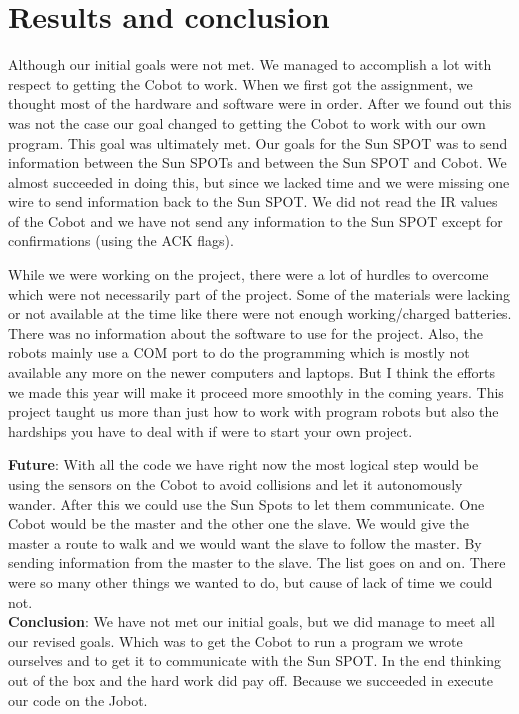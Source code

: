 \documentclass[a4paper,10pt]{article} %
\begin{document}

\section{Results and conclusion} %

Although our initial goals were not met. We managed to accomplish a lot with
respect to getting the Cobot to work. When we first got the assignment, we
thought most of the hardware and software were in order. After we found out this
was not the case our goal changed to getting the Cobot to work with our own
program. This goal was ultimately met. Our goals for the Sun SPOT was to send
information between the Sun SPOTs and between the Sun SPOT and Cobot. We almost
succeeded in doing this, but since we lacked time and we were missing one wire
to send information back to the Sun SPOT. We did not read the IR values of the
Cobot and we have not send any information to the Sun SPOT except for
confirmations (using the ACK flags).

While we were working on the project, there were a lot of hurdles to overcome
which were not necessarily part of the project. Some of the materials were
lacking or not available at the time like there were not enough working/charged
batteries. There was no information about the software to use for the project.
Also, the robots mainly use a COM port to do the programming which is mostly not
available any more on the newer computers and laptops. But I think the efforts
we made this year will make it proceed more smoothly in the coming years. This
project taught us more than just how to work with program robots but also the
hardships you have to deal with if were to start your own project.

\noindent \textbf{Future}: With all the code we have right now the most logical
step would be using the sensors on the Cobot to avoid collisions and let it
autonomously wander. After this we could use the Sun Spots to let them
communicate. One Cobot would be the master and the other one the slave. We
would give the master a route to walk and we would want the slave to follow the
master. By sending information from the master to the slave. The list goes on
and on. There were so many other things we wanted to do, but cause of lack of
time we could not. \\

\noindent \textbf{Conclusion}: We have not met our initial goals, but we did
manage to meet all our revised goals. Which was to get the Cobot to run a
program we wrote ourselves and to get it to communicate with the Sun SPOT.
In the end thinking out of the box and the hard work did pay off. Because we succeeded
in execute our code on the Jobot.
\end{document}

